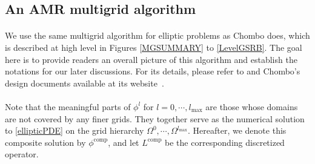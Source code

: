 \documentclass{ieee}
\numberwithin{equation}{section}
\begin{document}
\subsection{An AMR multigrid algorithm}

\paragraph{}We use the same multigrid algorithm for elliptic problems as Chombo does, which is described at high level in Figures \ref{MGSUMMARY} to \ref{LevelGSRB}. The goal here is to provide readers an overall picture of this algorithm and establish the notations for our later discussions. For its details,  please  refer to \cite{Martin:1996} and Chombo's design documents available at its website~\cite{Chombo}. 

\paragraph{}Note that the meaningful parts of $\phi^l$ for $l=0,\cdots,l_{\text{max}}$ are those  whose domains are not covered by any finer grids. They together serve as the numerical solution to \eqref{ellipticPDE} on the grid hierarchy $\Omega^0,\cdots,\Omega^{l_\text{max}}$. Hereafter, we denote  this composite solution by $\phi^{\text{comp}}$, and let $L^{\text{comp}}$ be the corresponding  discretized operator. 
 
\end{document}
